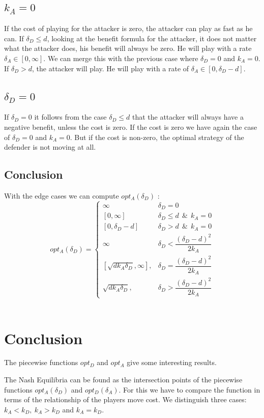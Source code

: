 \subsection*{$k_{A}=0$}
If the cost of playing for the attacker is zero, the attacker can play as fast as he can.  If $\delta_{D} \leq d$, looking at the benefit formula for the attacker, it does not matter what the attacker does, his benefit will always be zero. He will play with a rate $\delta_{A} \in [0,\infty ]$.  We can merge this with the previous case where $\delta_{D}=0$ and $k_{A}=0$.  If $\delta_{D} > d$, the attacker will play. He will play with a rate of $\delta_{A} \in [0, \delta_{D} - d ]$. 
\subsection*{$\delta_{D}=0$}
If $\delta_{D}=0$ it follows from the case $\delta_{D} \leq d$ that the attacker will always have a negative benefit, unless the cost is zero. If the cost is zero we have again the case of $\delta_{D}=0$ and $k_{A}=0$. But if the cost is non-zero, the optimal strategy of the defender is not moving at all. 

\subsection{Conclusion}
With the edge cases we can compute $opt_{A}(\delta_{D})$ : \\

 \begin{displaymath}
  opt_{A}(\delta_{D}) = \left\{
     \begin{array}{lr}
     \infty & \delta_{D} = 0 \\
     \left[0,\infty\right] & \delta_{D} \leq d ~~\& ~~k_{A}=0 \\
          \left[0,\delta_{D} - d\right] & \delta_{D} > d ~~\& ~~k_{A}=0 \\
                 \infty & \delta_{D} < \dfrac{(\delta_{D}-d)^{2}}{2k_{A}} \\
       \left[ \sqrt{d k_{A}\delta_{D}}, \infty\right],  & \delta_{D} = \dfrac{(\delta_{D}-d)^{2}}{2k_{A}} \\
       \sqrt{d k_{A}\delta_{D}}, & \delta_{D} > \dfrac{(\delta_{D}-d)^{2}}{2k_{A}}
     \end{array}
   \right.
\end{displaymath}
\\

\section{Conclusion}

The piecewise functions $opt_{D}$ and $opt_{A}$ give some interesting results. 

The Nash Equilibria can be found as the intersection points of the piecewise functions $opt_{A}(\delta_{D})$ and $opt_{D}(\delta_{A})$. For this we have to compare the function in terms of the relationship of the players move cost. We distinguish three cases: $k_{A} < k_{D} , ~k_{A} > k_{D} $ and $k_{A} = k_{D}$. 
